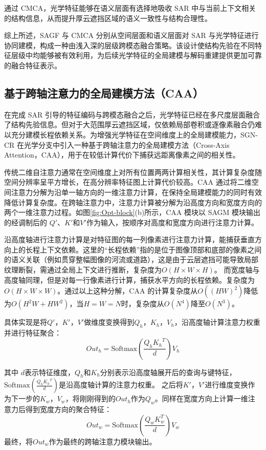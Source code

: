 通过 CMCA，光学特征能够在语义层面有选择地吸收 SAR 中与当前上下文相关的结构信息，从而提升厚云遮挡区域的语义一致性与结构合理性。

综上所述，SAGF 与 CMCA 分别从空间层面和语义层面对 SAR 与光学特征进行协同建模，构成一种由浅入深的层级跨模态融合策略。该设计使结构先验在不同特征层级中均能够被有效利用，为后续光学特征的全局建模与解码重建提供更加可靠的融合特征表示。

\subsection{基于跨轴注意力的全局建模方法（CAA）}

在完成 SAR 引导的特征编码与跨模态融合之后，光学特征已经在多尺度层面融合了结构先验信息。但对于大范围厚云遮挡区域，仅依赖局部卷积或逐像素融合仍难以充分建模长程依赖关系。为增强光学特征在空间维度上的全局建模能力，SGN-CR 在光学分支中引入一种基于跨轴注意力的全局建模方法（Cross-Axis Attention，CAA），用于在较低计算代价下捕获远距离像素之间的相关性。

传统二维自注意力通常在空间维度上对所有位置两两计算相关性，其计算复杂度随空间分辨率呈平方增长，在高分辨率特征图上计算代价较高。CAA 通过将二维空间注意力分解为沿单一轴方向的一维注意力计算，在保持全局建模能力的同时有效降低计算复杂度。在跨轴注意力中，注意力计算被分解为沿高度方向和宽度方向的两个一维注意力过程。如图\ref{fig:Opt-block}(b)所示，CAA 模块以 SAGM 模块输出的经调制后的 $Q'$、$K'$和$V'$作为输入，按顺序对高度和宽度方向进行注意力计算。

沿高度轴进行注意力计算是对特征图的每一列像素进行注意力计算，能捕获垂直方向上的长程上下文依赖。这里的“长程依赖”指的是位于图像顶部和底部的像素之间的语义关联（例如贯穿整幅图像的河流或道路），这是由于云层遮挡可能导致局部纹理断裂，需通过全局上下文进行推断，复杂度为$O(H \times W \times H)$。
而宽度轴与高度轴同理，但是对每一行像素进行计算，捕获水平方向的长程依赖。复杂度为$O(H \times W \times W)$。通过以上这种分解，CAA 的计算复杂度从$O((HW)^2)$降低为$O(H^2W+HW^2)$，当$H=W=N$时，复杂度从$O(N^4)$降至$O(N^3)$。

具体实现是将$Q'$，$K'$，$V'$做维度变换得到$Q_h$，$K_h$，$V_h$，沿高度轴计算注意力权重并进行特征聚合：
\begin{equation}
{Out}_h = \mathrm{Softmax}\left (\frac{Q_h {K_h}^T}{d}\right )V_h
\end{equation}

其中 $d$表示特征维度，$Q_h$和$K_h$分别表示沿高度轴展开后的查询与键特征，$\mathrm{Softmax}\left (\frac{Q_h {K_h}^T}{d}\right )$是沿高度轴计算的注意力权重。
之后将$K'$，$V'$进行维度变换作为下一步的$K_w$，$V_w$，将刚刚得到的${Out}_h$作为$Q_w$。同样在宽度方向上计算一维注意力后得到宽度方向的聚合特征：
\begin{equation}
{Out}_w = \mathrm{Softmax}\left (\frac{Q_w K_w^T}{d} \right )V_w
\end{equation}
最终，将${Out}_w$作为最终的跨轴注意力模块输出。

